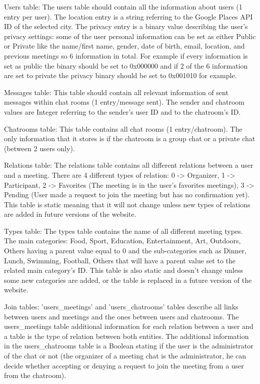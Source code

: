 \documentclass[conference]{IEEEtran}
\begin{document}
Users table:
The users table should contain all the information about users (1 entry per user). The location entry is a string referring to the Google Places API ID of the selected city. The privacy entry is a binary value describing the user’s privacy settings: some of the user personal information can be set as either Public or Private like the name/first name, gender, date of birth, email, location, and previous meetings so 6 information in total. For example if every information is set as public the binary should be set to 0x000000 and if 2 of the 6 information are set to private the privacy binary should be set to 0x001010 for example.

Messages table:
This table should contain all relevant information of sent messages within chat rooms (1 entry/message sent). The sender and chatroom values are Integer referring to the sender’s user ID and to the chatroom’s ID.

Chatrooms table:
This table contains all chat rooms (1 entry/chatroom). 
The only information that it stores is if the chatroom is a group chat or a private chat (between 2 users only).

Relations table:
The relations table contains all different relations between a user and a meeting. There are 4 different types of relation: 0 -> Organizer, 1 -> Participant, 2 -> Favorites (The meeting is in the user’s favorites meetings), 3 -> Pending (User made a request to join the meeting but has no confirmation yet). This table is static meaning that it will not change unless new types of relations are added in future versions of the website.

Types table:
The types table contains the name of all different meeting types. The main categories: Food, Sport, Education, Entertainment, Art, Outdoors, Others having a parent value equal to 0 and the sub-categories such as Dinner, Lunch, Swimming, Football, Others that will have a parent value set to the related main category’s ID. This table is also static and doesn’t change unless some new categories are added, or the table is replaced in a future version of the website.

Join tables:
'users\_meetings' and 'users\_chatrooms' tables describe all links between users and meetings and the ones between users and chatrooms. The users\_meetings table additional information for each relation between a user and a table is the type of relation between both entities. The additional information in the users\_chatrooms table is a Boolean stating if the user is the administrator of the chat or not (the organizer of a meeting chat is the administrator, he can decide whether accepting or denying a request to join the meeting from a user from the chatroom).
\end{document}

